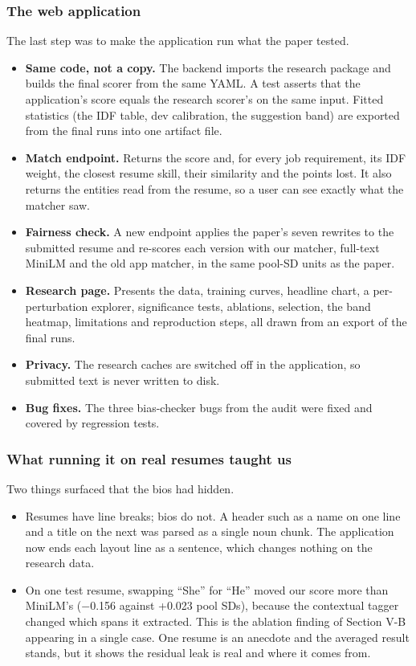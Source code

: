 \documentclass[conference,a4paper]{IEEEtran}
\begin{document}
\subsubsection{The web application} The last step was to make the application run what the paper tested.

\begin{itemize}
\item \textbf{Same code, not a copy.} The backend imports the research package and builds the final scorer from the same YAML. A test asserts that the application's score equals the research scorer's on the same input. Fitted statistics (the IDF table, dev calibration, the suggestion band) are exported from the final runs into one artifact file.
\item \textbf{Match endpoint.} Returns the score and, for every job requirement, its IDF weight, the closest resume skill, their similarity and the points lost. It also returns the entities read from the resume, so a user can see exactly what the matcher saw.
\item \textbf{Fairness check.} A new endpoint applies the paper's seven rewrites to the submitted resume and re-scores each version with our matcher, full-text MiniLM and the old app matcher, in the same pool-SD units as the paper.
\item \textbf{Research page.} Presents the data, training curves, headline chart, a per-perturbation explorer, significance tests, ablations, selection, the band heatmap, limitations and reproduction steps, all drawn from an export of the final runs.
\item \textbf{Privacy.} The research caches are switched off in the application, so submitted text is never written to disk.
\item \textbf{Bug fixes.} The three bias-checker bugs from the audit were fixed and covered by regression tests.
\end{itemize}
\subsubsection{What running it on real resumes taught us} Two things surfaced that the bios had hidden.

\begin{itemize}
\item Resumes have line breaks; bios do not. A header such as a name on one line and a title on the next was parsed as a single noun chunk. The application now ends each layout line as a sentence, which changes nothing on the research data.
\item On one test resume, swapping ``She'' for ``He'' moved our score more than MiniLM's ($-$0.156 against +0.023 pool SDs), because the contextual tagger changed which spans it extracted. This is the ablation finding of Section V-B appearing in a single case. One resume is an anecdote and the averaged result stands, but it shows the residual leak is real and where it comes from.
\end{itemize}
\end{document}
